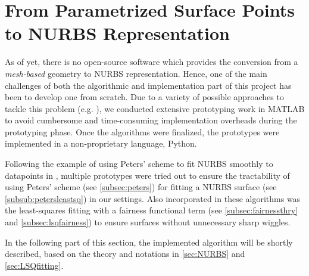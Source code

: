\section{From Parametrized Surface Points to NURBS Representation}
As of yet, there is no open-source software which provides the conversion from a \textit{mesh-based} geometry to NURBS representation. Hence, one of the main challenges of both the algorithmic and implementation part of this project has been to develop one from scratch. Due to a variety of possible approaches to tackle this problem (e.g. \cite{ eck1996automatic, becker2011advanced}), we conducted extensive prototyping work in MATLAB \cite{MATLAB} to avoid cumbersome and time-consuming implementation overheads during the prototyping phase. Once the algorithms were finalized, the prototypes were implemented in a non-proprietary language, Python. 

Following the example of using Peters' scheme to fit NURBS smoothly to datapoints in \cite{eck1996automatic}, multiple prototypes were tried out to ensure the tractability of using Peters' scheme (see \autoref{subsec:peters}) for fitting a NURBS surface (see \autoref{subsub:petersleastsq}) in our settings. Also incorporated in these algorithms was the least-squares fitting with a fairness functional term (see \autoref{subsec:fairnessthry} and \autoref{subsec:lsqfairness}) to ensure surfaces without unnecessary sharp wiggles.

In the following part of this section, the implemented algorithm will be shortly described, based on the theory and notations in \autoref{sec:NURBS} and \autoref{sec:LSQfitting}.

